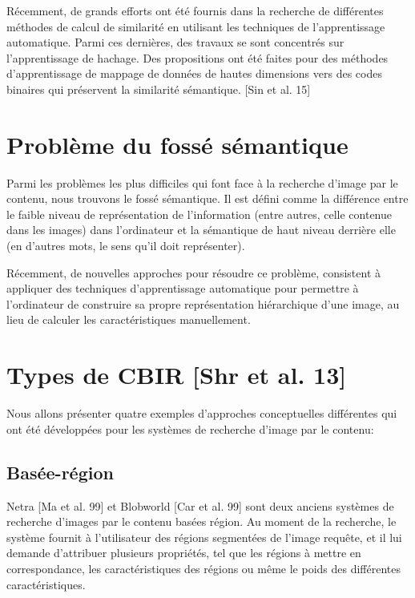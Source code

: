 	Récemment, de grands efforts ont été fournis dans la recherche de différentes méthodes de calcul de similarité en utilisant les techniques de l'apprentissage automatique. Parmi ces dernières, des travaux se sont concentrés sur l'apprentissage de hachage. Des propositions ont été faites pour des méthodes d'apprentissage de mappage de données de hautes dimensions vers des codes binaires qui préservent la similarité sémantique. [Sin et al. 15]

\section{Problème du fossé sémantique}

	Parmi les problèmes  les plus difficiles qui font face à la recherche d'image par le contenu, nous trouvons le fossé sémantique. Il est défini comme la différence entre le faible niveau de représentation de l'information (entre autres, celle contenue dans les images) dans l'ordinateur et la sémantique de haut niveau derrière elle (en d'autres mots, le sens qu'il doit représenter).
	
	Récemment, de nouvelles approches pour résoudre ce problème, consistent à appliquer des techniques d'apprentissage automatique pour permettre à l'ordinateur de construire sa propre représentation hiérarchique d'une image, au lieu de calculer les caractéristiques manuellement.


\section{Types de CBIR [Shr et al. 13]}

	Nous allons présenter quatre exemples d'approches conceptuelles différentes qui ont été développées pour les systèmes de recherche d'image par le contenu:

\subsection{Basée-région}

	Netra [Ma et al. 99] et Blobworld [Car et al. 99] sont deux anciens systèmes de recherche d'images par le contenu basées région. Au moment de la recherche, le système fournit à l'utilisateur des régions segmentées de l'image requête, et il lui demande d'attribuer plusieurs propriétés, tel que les régions à mettre en correspondance, les caractéristiques des régions ou même le poids des différentes caractéristiques.


